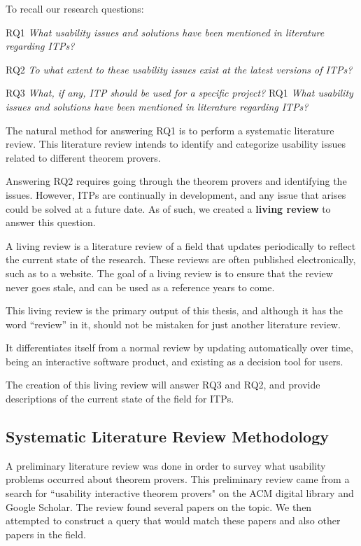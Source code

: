 \documentclass[
]{article}
\begin{document}
To recall our research questions:

RQ1 \emph{What usability issues and solutions have been mentioned in
literature regarding ITPs?}

RQ2 \emph{To what extent to these usability issues exist at the latest
versions of ITPs?}

RQ3 \emph{What, if any, ITP should be used for a specific project?} RQ1
\emph{What usability issues and solutions have been mentioned in
literature regarding ITPs?}

The natural method for answering RQ1 is to perform a systematic
literature review. This literature review intends to identify and
categorize usability issues related to different theorem provers.

Answering RQ2 requires going through the theorem provers and identifying
the issues. However, ITPs are continually in development, and any issue
that arises could be solved at a future date. As of such, we created a
\textbf{living review} to answer this question.

A living review is a literature review of a field that updates
periodically to reflect the current state of the research. These reviews
are often published electronically, such as to a website. The goal of a
living review is to ensure that the review never goes stale, and can be
used as a reference years to come.

This living review is the primary output of this thesis, and although it
has the word ``review'' in it, should not be mistaken for just another
literature review.

It differentiates itself from a normal review by updating automatically
over time, being an interactive software product, and existing as a
decision tool for users.

The creation of this living review will answer RQ3 and RQ2, and provide
descriptions of the current state of the field for ITPs.

\hypertarget{sec:review_methodology}{%
\subsection{Systematic Literature Review
Methodology}\label{sec:review_methodology}}

A preliminary literature review was done in order to survey what
usability problems occurred about theorem provers. This preliminary
review came from a search for ``usability interactive theorem provers"
on the ACM digital library and Google Scholar. The review found several
papers on the topic. We then attempted to construct a query that would
match these papers and also other papers in the field.
\end{document}
